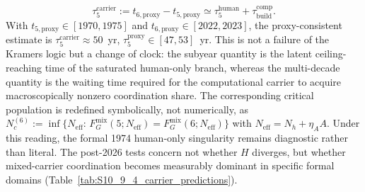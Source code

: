\documentclass[11pt]{article}
\begin{document}
\[
\tau_5^{\mathrm{carrier}}:= t_{6,\mathrm{proxy}}-t_{5,\mathrm{proxy}}\simeq \tau_5^{\mathrm{human}}+\tau_{\mathrm{build}}^{\mathrm{comp}}.
\]
With $t_{5,\mathrm{proxy}}\in[1970,1975]$ and $t_{6,\mathrm{proxy}}\in[2022,2023]$, the proxy-consistent estimate is $\tau_5^{\mathrm{carrier}}\approx 50$~yr, $\tau_5^{\mathrm{proxy}}\in[47,53]$~yr.  This is not a failure of the Kramers logic but a change of clock: the subyear quantity is the latent ceiling-reaching time of the saturated human-only branch, whereas the multi-decade quantity is the waiting time required for the computational carrier to acquire macroscopically nonzero coordination share.  The corresponding critical population is redefined symbolically, not numerically, as $N_c^{(6)}:=\inf\{N_{\mathrm{eff}}:\,F_G^{\mathrm{mix}}(5;N_{\mathrm{eff}})=F_G^{\mathrm{mix}}(6;N_{\mathrm{eff}})\}$ with $N_{\mathrm{eff}}=N_h+\eta_A A$.  Under this reading, the formal 1974 human-only singularity remains diagnostic rather than literal.  The post-2026 tests concern not whether $H$ diverges, but whether mixed-carrier coordination becomes measurably dominant in specific formal domains (Table~\ref{tab:S10_9_4_carrier_predictions}).
\end{document}

